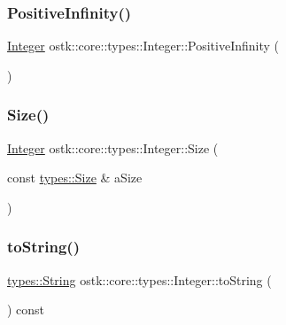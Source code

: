 \subsubsection{\texorpdfstring{Positive\+Infinity()}{PositiveInfinity()}}
{\footnotesize\ttfamily \hyperlink{classostk_1_1core_1_1types_1_1_integer}{Integer} ostk\+::core\+::types\+::\+Integer\+::\+Positive\+Infinity (\begin{DoxyParamCaption}{ }\end{DoxyParamCaption})\hspace{0.3cm}{\ttfamily [static]}}

\mbox{\label{classostk_1_1core_1_1types_1_1_integer_a5892cb6b5494141c0cf3bb42b3ee4d09}} 
\subsubsection{\texorpdfstring{Size()}{Size()}}
{\footnotesize\ttfamily \hyperlink{classostk_1_1core_1_1types_1_1_integer}{Integer} ostk\+::core\+::types\+::\+Integer\+::\+Size (\begin{DoxyParamCaption}\item[{const \hyperlink{namespaceostk_1_1core_1_1types_acf68f214a245e35a7c1994c84dc56746}{types\+::\+Size} \&}]{a\+Size }\end{DoxyParamCaption})\hspace{0.3cm}{\ttfamily [static]}}

\mbox{\label{classostk_1_1core_1_1types_1_1_integer_ac0dc94a7afb880229ff13cfd67f79be2}} 
\subsubsection{\texorpdfstring{to\+String()}{toString()}}
{\footnotesize\ttfamily \hyperlink{classostk_1_1core_1_1types_1_1_string}{types\+::\+String} ostk\+::core\+::types\+::\+Integer\+::to\+String (\begin{DoxyParamCaption}{ }\end{DoxyParamCaption}) const}

